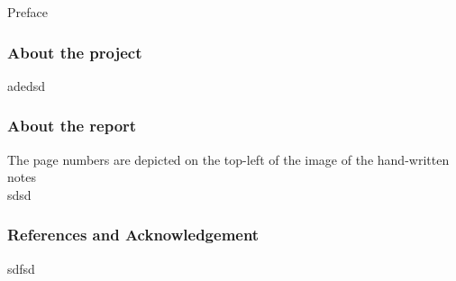 Preface
\subsubsection*{About the project}
adedsd
\subsubsection*{About the report}
The page numbers are depicted on the top-left of the image of the hand-written notes\\
sdsd
\subsubsection*{References and Acknowledgement}
sdfsd
